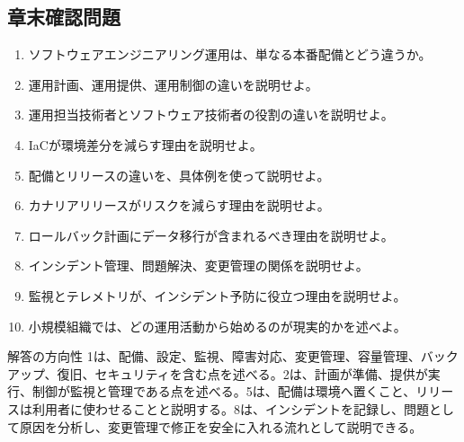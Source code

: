 \subsection{章末確認問題}

\begin{enumerate}
  \item ソフトウェアエンジニアリング運用は、単なる本番配備とどう違うか。
  \item 運用計画、運用提供、運用制御の違いを説明せよ。
  \item 運用担当技術者とソフトウェア技術者の役割の違いを説明せよ。
  \item IaCが環境差分を減らす理由を説明せよ。
  \item 配備とリリースの違いを、具体例を使って説明せよ。
  \item カナリアリリースがリスクを減らす理由を説明せよ。
  \item ロールバック計画にデータ移行が含まれるべき理由を説明せよ。
  \item インシデント管理、問題解決、変更管理の関係を説明せよ。
  \item 監視とテレメトリが、インシデント予防に役立つ理由を説明せよ。
  \item 小規模組織では、どの運用活動から始めるのが現実的かを述べよ。
\end{enumerate}

\begin{pointbox}{解答の方向性}
1は、配備、設定、監視、障害対応、変更管理、容量管理、バックアップ、復旧、セキュリティを含む点を述べる。2は、計画が準備、提供が実行、制御が監視と管理である点を述べる。5は、配備は環境へ置くこと、リリースは利用者に使わせることと説明する。8は、インシデントを記録し、問題として原因を分析し、変更管理で修正を安全に入れる流れとして説明できる。
\end{pointbox}
